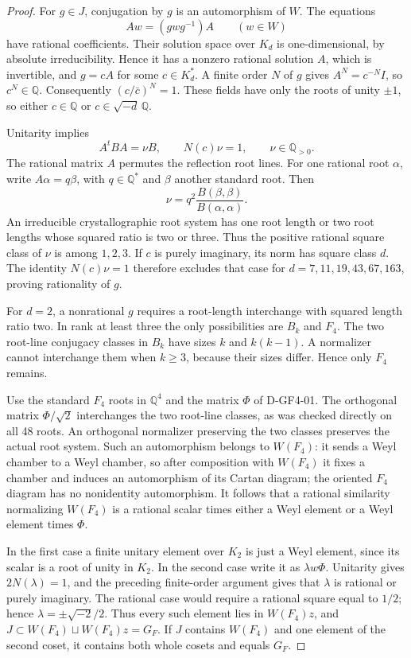 \begin{proof}
For \(g\in J\), conjugation by \(g\) is an automorphism of \(W\).
The equations
\[
                  A w=(g w g^{-1})A\qquad(w\in W)
\]
have rational coefficients. Their solution space over \(K_d\) is
one-dimensional, by absolute irreducibility. Hence it has a nonzero
rational solution \(A\), which is invertible, and \(g=cA\) for
some \(c\in K_d^*\). A finite order \(N\) of \(g\) gives
\(A^N=c^{-N}I\), so \(c^N\in\mathbb Q\). Consequently
\((c/\bar c)^N=1\). These fields have only the roots of unity
\(\pm1\), so either \(c\in\mathbb Q\) or
\(c\in\sqrt{-d}\,\mathbb Q\).

Unitarity implies
\[
                    A^tBA=\nu B,\qquad N(c)\nu=1,
                    \qquad \nu\in\mathbb Q_{>0}.
\]
The rational matrix \(A\) permutes the reflection root lines. For
one rational root \(\alpha\), write \(A\alpha=q\beta\), with
\(q\in\mathbb Q^*\) and \(\beta\) another standard root. Then
\[
             \nu=q^2\frac{B(\beta,\beta)}{B(\alpha,\alpha)}.
\]
An irreducible crystallographic root system has one root length or
two root lengths whose squared ratio is two or three. Thus the positive
rational square class of \(\nu\) is among \(1,2,3\).
If \(c\) is purely imaginary, its norm has square class \(d\).
The identity \(N(c)\nu=1\) therefore excludes that case for
\(d=7,11,19,43,67,163\), proving rationality of \(g\).

For \(d=2\), a nonrational \(g\) requires a root-length interchange
with squared length ratio two. In rank at least three the only
possibilities are \(B_k\) and \(F_4\). The two root-line conjugacy
classes in \(B_k\) have sizes \(k\) and \(k(k-1)\). A normalizer
cannot interchange them when \(k\ge3\), because their sizes differ.
Hence only \(F_4\) remains.

Use the standard \(F_4\) roots in \(\mathbb Q^4\) and the matrix
\(\Phi\) of D-GF4-01. The orthogonal matrix
\(\Phi/\sqrt2\) interchanges the two root-line classes, as was
checked directly on all 48 roots. An orthogonal normalizer preserving
the two classes preserves the actual root system. Such an automorphism
belongs to \(W(F_4)\): it sends a Weyl chamber to a Weyl chamber,
so after composition with \(W(F_4)\) it fixes a chamber and induces
an automorphism of its Cartan diagram; the oriented \(F_4\) diagram
has no nonidentity automorphism. It follows that a rational similarity
normalizing \(W(F_4)\) is a rational scalar times either a Weyl
element or a Weyl element times \(\Phi\).

In the first case a finite unitary element over \(K_2\) is just a
Weyl element, since its scalar is a root of unity in \(K_2\).
In the second case write it as \(\lambda w\Phi\). Unitarity gives
\(2N(\lambda)=1\), and the preceding finite-order argument gives
that \(\lambda\) is rational or purely imaginary. The rational
case would require a rational square equal to \(1/2\); hence
\(\lambda=\pm\sqrt{-2}/2\). Thus every such element lies in
\(W(F_4)z\), and \(J\subset W(F_4)\sqcup W(F_4)z=G_F\).
If \(J\) contains \(W(F_4)\) and one element of the second coset,
it contains both whole cosets and equals \(G_F\).
\end{proof}

